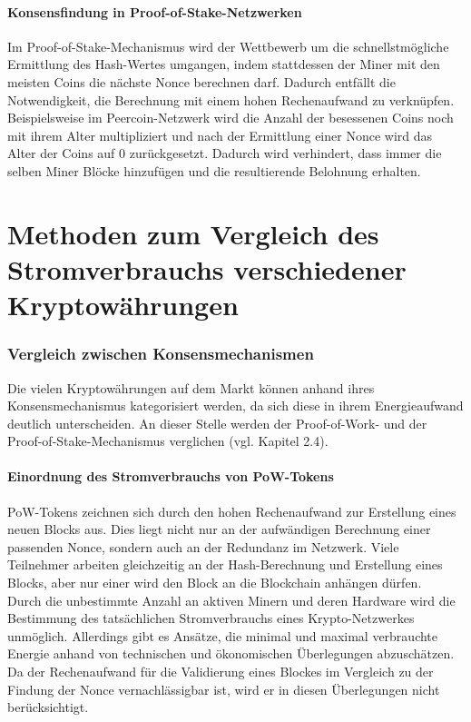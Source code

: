 \documentclass[12pt]{article}
\begin{document}
\subsection{Konsensfindung in Proof-of-Stake-Netzwerken}
Im Proof-of-Stake-Mechanismus wird der Wettbewerb um die schnellstmögliche Ermittlung des Hash-Wertes umgangen, indem stattdessen der Miner mit den meisten Coins die nächste Nonce berechnen darf. Dadurch entfällt die Notwendigkeit, die Berechnung mit einem hohen Rechenaufwand zu verknüpfen. Beispielsweise im Peercoin-Netzwerk wird die Anzahl der besessenen Coins noch mit ihrem Alter multipliziert und nach der Ermittlung einer Nonce wird das Alter der Coins auf 0 zurückgesetzt. Dadurch wird verhindert, dass immer die selben Miner Blöcke hinzufügen und die resultierende Belohnung erhalten.

\part{Methoden zum Vergleich des Stromverbrauchs verschiedener Kryptowährungen}

\section{Vergleich zwischen Konsensmechanismen}
Die vielen Kryptowährungen auf dem Markt können anhand ihres Konsensmechanismus kategorisiert werden, da sich diese in ihrem Energieaufwand deutlich unterscheiden. An dieser Stelle werden der Proof-of-Work- und der Proof-of-Stake-Mechanismus verglichen (vgl. Kapitel 2.4).
\subsection{Einordnung des Stromverbrauchs von PoW-Tokens}
PoW-Tokens zeichnen sich durch den hohen Rechenaufwand zur Erstellung eines neuen Blocks aus. Dies liegt nicht nur an der aufwändigen Berechnung einer passenden Nonce, sondern auch an der Redundanz im Netzwerk. Viele Teilnehmer arbeiten gleichzeitig an der Hash-Berechnung und Erstellung eines Blocks, aber nur einer wird den Block an die Blockchain anhängen dürfen.\\
Durch die unbestimmte Anzahl an aktiven Minern und deren Hardware wird die Bestimmung des tatsächlichen Stromverbrauchs eines Krypto-Netzwerkes unmöglich. Allerdings gibt es Ansätze, die minimal und maximal verbrauchte Energie anhand von technischen und ökonomischen Überlegungen abzuschätzen. Da der Rechenaufwand für die Validierung eines Blockes im Vergleich zu der Findung der Nonce vernachlässigbar ist, wird er in diesen Überlegungen nicht berücksichtigt.
\end{document}
